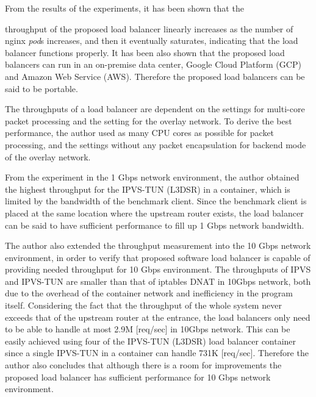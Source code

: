 From the results of the experiments, it has been shown that the 

throughput of the proposed load balancer linearly increases as the number of nginx {\em pod}s increases, and then it eventually saturates, indicating that the load balancer functions properly.
It has been also shown that the proposed load balancers can run in an on-premise data center, Google Cloud Platform (GCP) and Amazon Web Service (AWS).
Therefore the proposed load balancers can be said to be portable.

The throughputs of a load balancer are dependent on the settings for multi-core packet processing and the setting for the overlay network.
To derive the best performance, the author used as many CPU cores as possible for packet processing, and the settings without any packet encapsulation for backend mode of the overlay network.

%
From the experiment in the 1 Gbps network environment, the author obtained the highest throughput for the IPVS-TUN (L3DSR) in a container, which is limited by the bandwidth of the benchmark client.
  Since the benchmark client is placed at the same location where the upstream router exists, the load balancer can be said to have sufficient performance to fill up 1 Gbps network bandwidth.




The author also extended the throughput measurement into the 10 Gbps network environment, in order to verify that proposed software load balancer is capable of providing needed throughput for 10 Gbps environment.
The throughputs of IPVS and IPVS-TUN are smaller than that of iptables DNAT in 10Gbps network, both due to the overhead of the container network and inefficiency in the program itself.
Considering the fact that the throughput of the whole system never exceeds that of the upstream router at the entrance, the load balancers only need to be able to handle at most 2.9M [req/sec] in 10Gbps network.
This can be easily achieved using four of the IPVS-TUN (L3DSR) load balancer container since a single IPVS-TUN in a container can handle 731K [req/sec].
Therefore the author also concludes that although there is a room for improvements the proposed load balancer has sufficient performance for 10 Gbps network environment.



